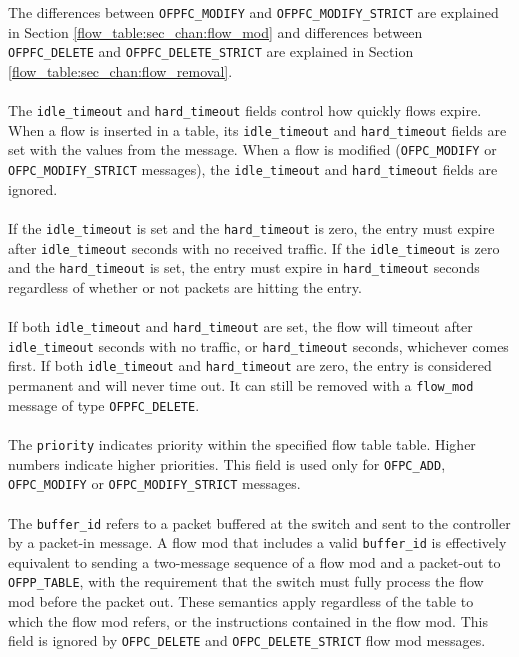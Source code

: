 
The differences between \verb|OFPFC_MODIFY| and \verb|OFPFC_MODIFY_STRICT| are explained in Section \ref{flow_table:sec_chan:flow_mod} and differences between \verb|OFPFC_DELETE| and \verb|OFPFC_DELETE_STRICT| are explained in Section \ref{flow_table:sec_chan:flow_removal}.
\\\\
The \verb|idle_timeout| and \verb|hard_timeout| fields control how quickly flows expire. When a flow is inserted in a table, its \verb|idle_timeout| and \verb|hard_timeout| fields are set with the values from the message. When a flow is modified (\verb|OFPC_MODIFY| or \verb|OFPC_MODIFY_STRICT| messages), the \verb|idle_timeout| and \verb|hard_timeout| fields are ignored.
\\\\
If the \verb|idle_timeout| is set and the \verb|hard_timeout| is zero, the entry must expire after \verb|idle_timeout| seconds with no received traffic.  If the \verb|idle_timeout| is zero and the \verb|hard_timeout| is set, the entry must expire in \verb|hard_timeout| seconds regardless of whether or not packets are hitting the entry.
\\\\
If both \verb|idle_timeout| and \verb|hard_timeout| are set, the flow will timeout after \verb|idle_timeout| seconds with no traffic, or \verb|hard_timeout| seconds, whichever comes first.  If both \verb|idle_timeout| and \verb|hard_timeout| are zero, the entry is considered permanent and will never time out.  It can still be removed with a \verb|flow_mod| message of type \verb|OFPFC_DELETE|. 
\\\\
The \verb|priority| indicates priority within the specified flow table table. Higher numbers indicate higher priorities. This field is used only for \verb|OFPC_ADD|, \verb|OFPC_MODIFY| or \verb|OFPC_MODIFY_STRICT| messages.
\\\\
The \verb|buffer_id| refers to a packet buffered at the switch and sent to the controller by a packet-in message.  A flow mod that includes a valid \verb|buffer_id| is effectively equivalent to sending a two-message sequence of a flow mod and a packet-out to \verb|OFPP_TABLE|, with the requirement that the switch must fully process the flow mod before the packet out.  These semantics apply regardless of the table to which the flow mod refers, or the instructions contained in the flow mod. This field is ignored by \verb|OFPC_DELETE| and \verb|OFPC_DELETE_STRICT| flow mod messages.
